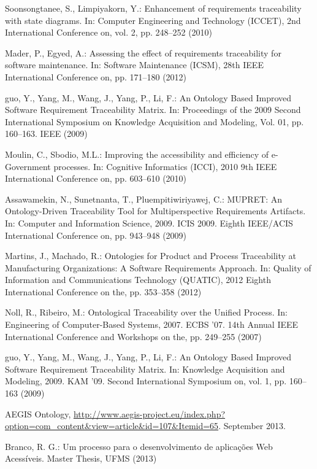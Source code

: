\documentclass[runningheads,a4paper]{llncs}
\begin{document}
\begin{thebibliography}{4}
 Soonsongtanee, S., Limpiyakorn, Y.: Enhancement of requirements traceability
with state diagrams. In: Computer Engineering and Technology (ICCET), 2nd International Conference on, vol. 2, pp. 248--252 (2010)

 Mader, P., Egyed, A.: Assessing the effect of requirements traceability for software
maintenance. In: Software Maintenance (ICSM), 28th IEEE International Conference on, pp. 171--180 (2012)

 guo, Y., Yang, M., Wang, J., Yang, P., Li, F.: An Ontology
Based Improved Software Requirement Traceability Matrix. In: Proceedings of the
2009 Second International Symposium on Knowledge Acquisition and Modeling,
Vol. 01, pp. 160--163. IEEE (2009)

 Moulin, C., Sbodio, M.L.: Improving the accessibility and
efficiency of e-Government processes. In: Cognitive Informatics (ICCI), 2010 9th
IEEE International Conference on, pp. 603--610 (2010)

 Assawamekin, N., Sunetnanta, T., Pluempitiwiriyawej, C.: MUPRET: An
Ontology-Driven Traceability Tool for Multiperspective Requirements Artifacts.
In: Computer and Information Science, 2009. ICIS 2009. Eighth IEEE/ACIS
International Conference on, pp. 943--948 (2009)

 Martins, J., Machado, R.: Ontologies for Product and Process
Traceability at Manufacturing Organizations: A Software Requirements Approach.
In: Quality of Information and Communications Technology (QUATIC), 2012 Eighth
International Conference on the, pp. 353--358 (2012)

 Noll, R., Ribeiro, M.: Ontological Traceability over
the Unified Process. In: Engineering of Computer-Based Systems, 2007. ECBS '07.
14th Annual IEEE International Conference and Workshops on the, pp.
249--255 (2007)

 guo, Y., Yang, M., Wang, J., Yang, P., Li, F.: An Ontology Based Improved
Software Requirement Traceability Matrix. In: Knowledge Acquisition and
Modeling, 2009. KAM '09. Second International Symposium on, vol. 1, pp.
160--163 (2009)

 AEGIS Ontology, \url{http://www.aegis-project.eu/index.php?option=com_content&view=article&id=107&Itemid=65}. September 2013.

 Branco, R. G.: Um processo para o desenvolvimento de aplicações Web Acessíveis.
Master Thesis, UFMS (2013)

\end{thebibliography}
\end{document}
